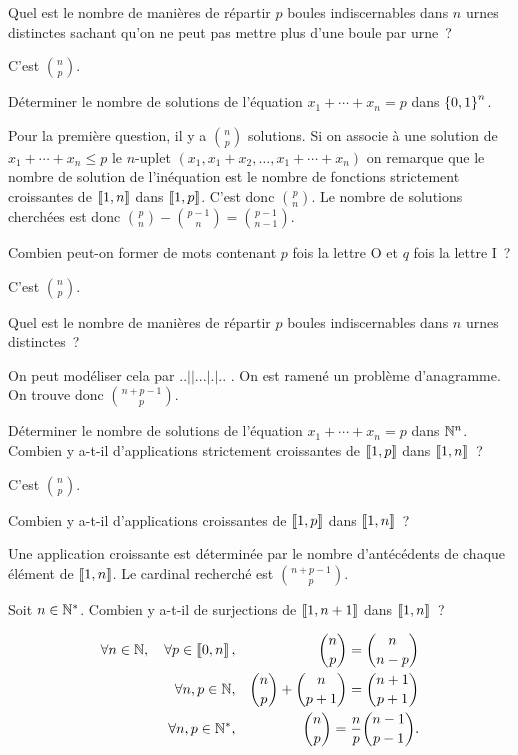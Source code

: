 \documentclass{magnolia}
\begin{document}
\begin{exos}
\exo Quel est le nombre de manières de répartir $p$ boules indiscernables
dans $n$ urnes distinctes sachant qu'on ne peut pas mettre plus d'une boule par urne~?
  \begin{sol}
  C'est $\binom{n}{p}$.
  \end{sol}  
\exo Déterminer le nombre de solutions de l'équation $x_1+\cdots+x_n=p$ dans
  $\left\{0,1\right\}^n$.
  \begin{sol}
  Pour la première question, il y a $\binom{n}{p}$ solutions. Si on associe
  à une solution de $x_1+\cdots+x_n\leq p$ le $n$-uplet
  $(x_1,x_1+x_2,\ldots,x_1+\cdots+x_n)$ on remarque que le nombre de solution
  de l'inéquation est le nombre de fonctions strictement croissantes de
  $\left\llbracket 1,n\right\rrbracket$ dans $\left\llbracket 1,p\right\rrbracket$. C'est donc $\binom{p}{n}$. Le nombre
  de solutions cherchées est donc
  $\binom{p}{n}-\binom{p-1}{n}=\binom{p-1}{n-1}$.
  \end{sol}
\exo Combien peut-on former de mots contenant $p$ fois
  la lettre O et $q$ fois la lettre I~?
  \begin{sol}
  C'est $\binom{n}{p}$.
  \end{sol}
\exo Quel est le nombre de manières de répartir $p$ boules indiscernables
  dans $n$ urnes distinctes~?
  \begin{sol}
  On peut modéliser cela par \og $..||...|.|..$ \fg. On est ramené un problème
  d'anagramme. On trouve donc $\binom{n+p-1}{p}$.
  \end{sol}
\exo Déterminer le nombre de solutions de l'équation $x_1+\cdots+x_n=p$ dans
  $\mathbb{N}^n$.
\exo Combien y a-t-il d'applications strictement
  croissantes de $\left\llbracket 1,p\right\rrbracket$ dans $\left\llbracket 1,n\right\rrbracket$~?
  \begin{sol}
  C'est $\binom{n}{p}$.
  \end{sol}
\exo Combien y a-t-il d'applications croissantes de $\left\llbracket 1,p\right\rrbracket$ dans $\left\llbracket 1,n\right\rrbracket$~?
  \begin{sol}
  Une application croissante est déterminée par le nombre d'antécédents de
  chaque élément de $\left\llbracket 1,n\right\rrbracket$. Le cardinal recherché est
  $\binom{n+p-1}{p}$.
  \end{sol}
\exo Soit $n\in{\mathbb{N}^*}$. Combien y a-t-il de surjections de $\left\llbracket 1,n+1\right\rrbracket$
  dans $\left\llbracket 1,n\right\rrbracket$~?
\end{exos}

\begin{proposition}
\begin{eqnarray*}
\forall n\in\mathbb{N} ,\quad \forall p\in\left\llbracket 0,n\right\rrbracket, & &
  \binom{n}{p}=\binom{n}{n-p}\\
\forall n,p\in\mathbb{N}, & & \binom{n}{p}+\binom{n}{p+1}=\binom{n+1}{p+1}\\
\forall n,p\in{\mathbb{N}^*}, & & \binom{n}{p}=\frac{n}{p}\binom{n-1}{p-1}.
\end{eqnarray*}
\end{proposition}
\end{document}
